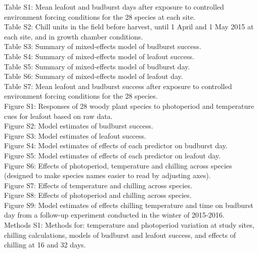 \documentclass[11pt]{article}
\begin{document}
\newpage
\noindent Table S1: Mean leafout and budburst days after exposure to controlled environment forcing conditions for the 28 species at each site.\\
Table S2: Chill units in the field before harvest, until 1 April and 1 May 2015 at each site, and in growth chamber conditions.\\
Table S3: Summary of mixed-effects model of budburst success.\\
Table S4: Summary of mixed-effects model of leafout success.\\
Table S5: Summary of mixed-effects model of budburst day.\\
Table S6: Summary of mixed-effects model of leafout day.\\
Table S7: Mean leafout and budburst success after exposure to controlled environment forcing conditions for the 28 species.\\
Figure S1: Responses of 28 woody plant species to photoperiod and temperature cues for leafout based on raw data.\\
Figure S2: Model estimates of budburst success.\\
Figure S3: Model estimates of leafout success.\\
Figure S4: Model estimates of effects of each predictor on budburst day.\\
Figure S5: Model estimates of effects of each predictor on leafout day.\\
Figure S6: Effects of photoperiod, temperature and chilling across species (designed to make species names easier to read by adjusting axes).\\
Figure S7: Effects of temperature and chilling across species.\\
Figure S8: Effects of photoperiod and chilling across species.\\
Figure S9: Model estimates of effects chilling temperature and time on budburst day from a follow-up experiment conducted in the winter of 2015-2016.\\
Methods S1: Methods for: temperature and photoperiod variation at study sites, chilling calculations, models of budburst and leafout success, and effects of chilling at 16 and 32 days.
\end{document}
